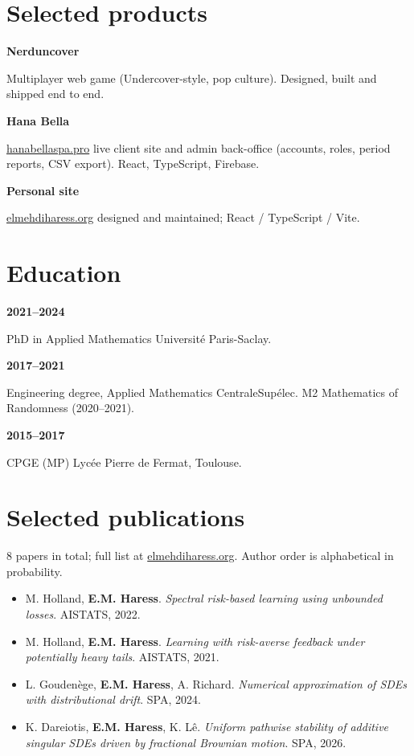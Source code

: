 \documentclass[10pt,a4paper]{article}
\newlength{\datecol}\setlength{\datecol}{0.155\textwidth}
\newlength{\gutter}\setlength{\gutter}{0.85em}
\newlength{\bodycol}
\newcommand{\skillrow}[2]{%
  \par\noindent
  \begin{minipage}[t]{\datecol}
    \vspace{0pt}\raggedright{\headingfont\bfseries\footnotesize #1}
  \end{minipage}%
  \hspace{\gutter}%
  \begin{minipage}[t]{\bodycol}
    \vspace{0pt}\raggedright\footnotesize #2
  \end{minipage}%
  \par\vspace{0.35ex}
}
\begin{document}
\section{Selected products}
\skillrow{Nerduncover}{Multiplayer web game (Undercover-style, pop culture). Designed, built and shipped
end to end.}
\skillrow{Hana Bella}{\href{https://hanabellaspa.pro}{hanabellaspa.pro} \textemdash{} live client site and
admin back-office (accounts, roles, period reports, CSV export). React, TypeScript, Firebase.}
\skillrow{Personal site}{\href{https://elmehdiharess.org}{elmehdiharess.org} \textemdash{} designed and
maintained; React / TypeScript / Vite.}

\section{Education}
\skillrow{2021--2024}{PhD in Applied Mathematics \textemdash{} Université Paris-Saclay.}
\skillrow{2017--2021}{Engineering degree, Applied Mathematics \textemdash{} CentraleSupélec. M2 Mathematics of Randomness (2020--2021).}
\skillrow{2015--2017}{CPGE (MP) \textemdash{} Lycée Pierre de Fermat, Toulouse.}

\section{Selected publications}
{\scriptsize\color{muted}8 papers in total; full list at \href{https://elmehdiharess.org}{elmehdiharess.org}. Author order is alphabetical in probability.\par}
\vspace{0.22ex}
\begin{itemize}[leftmargin=1.15em, itemsep=0.10ex, topsep=0pt, parsep=0pt, label={\textcolor{accent}{\scriptsize$\blacktriangleright$}}]
  \scriptsize
  \item M. Holland, \textbf{E.M. Haress}. \emph{Spectral risk-based learning using unbounded losses}. AISTATS, 2022.
  \item M. Holland, \textbf{E.M. Haress}. \emph{Learning with risk-averse feedback under potentially heavy tails}. AISTATS, 2021.
  \item L. Goudenège, \textbf{E.M. Haress}, A. Richard. \emph{Numerical approximation of SDEs with
  distributional drift}. SPA, 2024.
  \item K. Dareiotis, \textbf{E.M. Haress}, K. Lê. \emph{Uniform pathwise stability of additive singular SDEs
  driven by fractional Brownian motion}. SPA, 2026.
\end{itemize}
\end{document}
